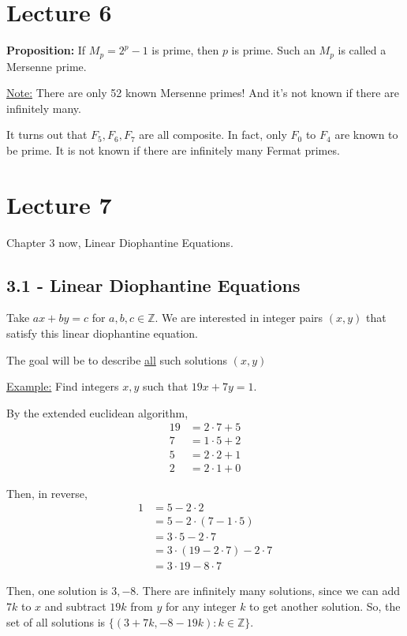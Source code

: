 \documentclass{article}
\newcommand*{\zz}{\mathbb{Z}}%
\begin{document}
\section{Lecture 6}

\textbf{Proposition:} If $M_p=2^p-1$ is prime, then $p$ is prime. Such an $M_p$ is called a Mersenne prime.

\underline{Note:} There are only 52 known Mersenne primes! And it's not known if there are infinitely many.

It turns out that $F_5, F_6, F_7$ are all composite. In fact, only $F_0$ to $F_4$ are known to be prime. It is not known if there are infinitely many Fermat primes.

\section{Lecture 7}

Chapter 3 now, Linear Diophantine Equations.

\subsection{3.1 - Linear Diophantine Equations}

Take $ax+by=c$ for $a,b,c\in \zz$. We are interested in integer pairs $(x,y)$ that satisfy this linear diophantine equation.

The goal will be to describe \underline{all} such solutions $(x,y)$

\underline{Example:} Find integers $x,y$ such that $19x+7y=1$.

By the extended euclidean algorithm, \begin{align*}
    19 &= 2\cdot 7 + 5 \\
    7 &= 1\cdot 5 + 2 \\
    5 &= 2\cdot 2 + 1 \\
    2 &= 2\cdot 1 + 0
\end{align*}

Then, in reverse, \begin{align*}
    1 &= 5 - 2\cdot 2 \\
      &= 5 - 2\cdot (7 - 1\cdot 5) \\
      &= 3\cdot 5 - 2\cdot 7 \\
      &= 3\cdot (19 - 2\cdot 7) - 2\cdot 7 \\
      &= 3\cdot 19 - 8\cdot 7
\end{align*}

Then, one solution is $3, -8$. There are infinitely many solutions, since we can add $7k$ to $x$ and subtract $19k$ from $y$ for any integer $k$ to get another solution. So, the set of all solutions is $\{ (3+7k, -8-19k) : k\in \zz \}$.
\end{document}
